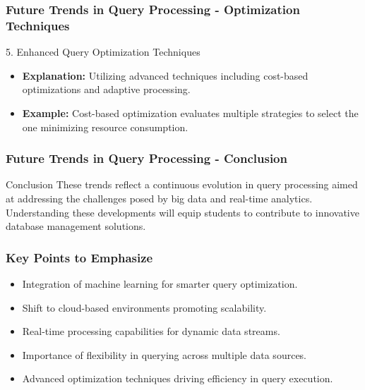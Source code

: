 \documentclass[aspectratio=169]{beamer}
\begin{document}
\begin{frame}[fragile]
    \frametitle{Future Trends in Query Processing - Optimization Techniques}
    \begin{block}{5. Enhanced Query Optimization Techniques}
        \begin{itemize}
            \item \textbf{Explanation:} Utilizing advanced techniques including cost-based optimizations and adaptive processing.
            \item \textbf{Example:}
                Cost-based optimization evaluates multiple strategies to select the one minimizing resource consumption.
        \end{itemize}
    \end{block}
\end{frame}

\begin{frame}[fragile]
    \frametitle{Future Trends in Query Processing - Conclusion}
    \begin{block}{Conclusion}
        These trends reflect a continuous evolution in query processing aimed at addressing the challenges posed by big data and real-time analytics. Understanding these developments will equip students to contribute to innovative database management solutions.
    \end{block}
\end{frame}

\begin{frame}[fragile]
    \frametitle{Key Points to Emphasize}
    \begin{itemize}
        \item Integration of machine learning for smarter query optimization.
        \item Shift to cloud-based environments promoting scalability.
        \item Real-time processing capabilities for dynamic data streams.
        \item Importance of flexibility in querying across multiple data sources.
        \item Advanced optimization techniques driving efficiency in query execution.
    \end{itemize}
\end{frame}
\end{document}
